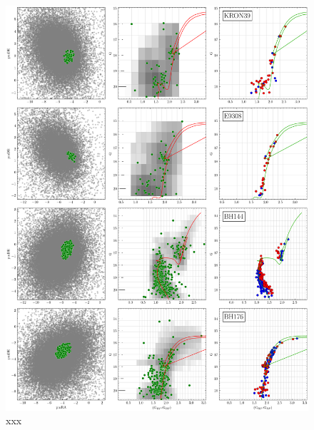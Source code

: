 \documentclass[draft]{aa}
\begin{document}
\begin{appendix}
 \begin{figure}
  \centering
  \includegraphics[height=.95\textheight]{figs/16_fpars.png}
  \caption{xxx}
  \label{fig:16fpars}
 \end{figure}


\end{appendix}
\end{document}
